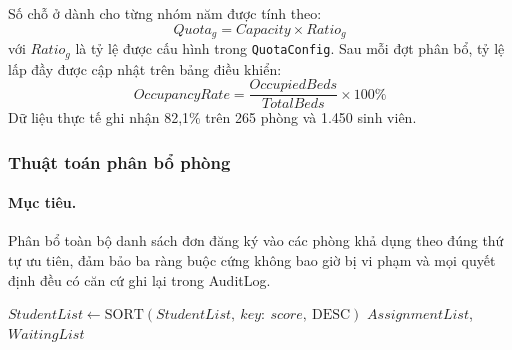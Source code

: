 \documentclass[../DoAn.tex]{subfiles}
\begin{document}
Số chỗ ở dành cho từng nhóm năm được tính theo:
\begin{equation}
Quota_g = Capacity \times Ratio_g
\label{eq:quota}
\end{equation}
với $Ratio_g$ là tỷ lệ được cấu hình trong \texttt{QuotaConfig}. Sau mỗi đợt
phân bổ, tỷ lệ lấp đầy được cập nhật trên bảng điều khiển:
\begin{equation}
OccupancyRate = \frac{OccupiedBeds}{TotalBeds} \times 100\%
\label{eq:occupancy}
\end{equation}
Dữ liệu thực tế ghi nhận 82,1\% trên 265 phòng và 1.450 sinh viên.

\subsubsection{Thuật toán phân bổ phòng}

\begin{minipage}{\linewidth}
\paragraph{Mục tiêu.}
Phân bổ toàn bộ danh sách đơn đăng ký vào các phòng khả dụng theo đúng thứ
tự ưu tiên, đảm bảo ba ràng buộc cứng không bao giờ bị vi phạm và mọi quyết
định đều có căn cứ ghi lại trong AuditLog.

\begin{algorithm}[H]
\small
\caption{\textit{QuotaBasedRoomAllocation}}
$StudentList \leftarrow \text{SORT}(StudentList,\ key{:}\ score,\ \text{DESC})$\;
\KwReturn $AssignmentList$, $WaitingList$\;
\end{algorithm}
\end{minipage}
\end{document}
